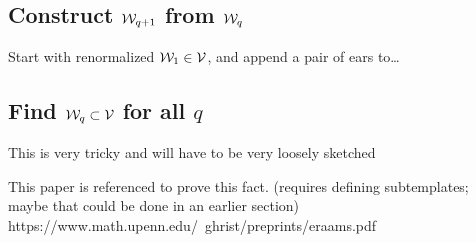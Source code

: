 \documentclass[paper.tex]{subfiles}
\begin{document}
\subsection{Construct $\mathcal{W}_{q+1}$ from $\mathcal{W}_q$}

Start with renormalized $\mathcal{W}_1 \in \mathcal{V}$, and append a pair of ears to\dots

\subsection{Find $\mathcal{W}_q \subset \mathcal{V}$ for all $q$}

This is very tricky and will have to be very loosely sketched

This paper is referenced to prove this fact. (requires defining subtemplates; maybe that could be done in an earlier section)
https://www.math.upenn.edu/~ghrist/preprints/eraams.pdf
\end{document}
